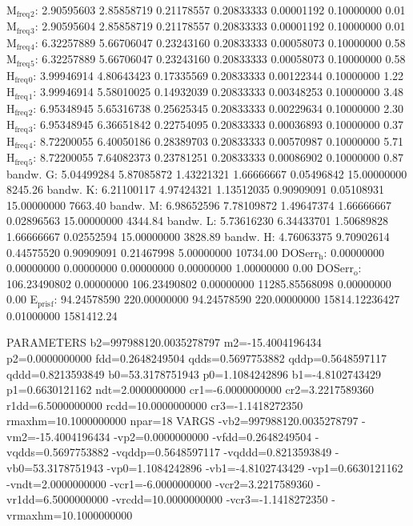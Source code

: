 \documentclass[11pt]{article}
\begin{document}
M\(_{\text{freq}}\)\(_{\text{2}}\):   2.90595603   2.85858719   0.21178557   0.20833333   0.00001192   0.10000000         0.01
M\(_{\text{freq}}\)\(_{\text{3}}\):   2.90595604   2.85858719   0.21178557   0.20833333   0.00001192   0.10000000         0.01
M\(_{\text{freq}}\)\(_{\text{4}}\):   6.32257889   5.66706047   0.23243160   0.20833333   0.00058073   0.10000000         0.58
M\(_{\text{freq}}\)\(_{\text{5}}\):   6.32257889   5.66706047   0.23243160   0.20833333   0.00058073   0.10000000         0.58
H\(_{\text{freq}}\)\(_{\text{0}}\):   3.99946914   4.80643423   0.17335569   0.20833333   0.00122344   0.10000000         1.22
H\(_{\text{freq}}\)\(_{\text{1}}\):   3.99946914   5.58010025   0.14932039   0.20833333   0.00348253   0.10000000         3.48
H\(_{\text{freq}}\)\(_{\text{2}}\):   6.95348945   5.65316738   0.25625345   0.20833333   0.00229634   0.10000000         2.30
H\(_{\text{freq}}\)\(_{\text{3}}\):   6.95348945   6.36651842   0.22754095   0.20833333   0.00036893   0.10000000         0.37
H\(_{\text{freq}}\)\(_{\text{4}}\):   8.72200055   6.40050186   0.28389703   0.20833333   0.00570987   0.10000000         5.71
H\(_{\text{freq}}\)\(_{\text{5}}\):   8.72200055   7.64082373   0.23781251   0.20833333   0.00086902   0.10000000         0.87
bandw. G:   5.04499284   5.87085872   1.43221321   1.66666667   0.05496842  15.00000000      8245.26
bandw. K:   6.21100117   4.97424321   1.13512035   0.90909091   0.05108931  15.00000000      7663.40
bandw. M:   6.98652596   7.78109872   1.49647374   1.66666667   0.02896563  15.00000000      4344.84
bandw. L:   5.73616230   6.34433701   1.50689828   1.66666667   0.02552594  15.00000000      3828.89
bandw. H:   4.76063375   9.70902614   0.44575520   0.90909091   0.21467998   5.00000000     10734.00
DOSerr\(_{\text{h}}\):   0.00000000   0.00000000   0.00000000   0.00000000   0.00000000   1.00000000         0.00
DOSerr\(_{\text{o}}\): 106.23490802   0.00000000 106.23490802   0.00000000 11285.85568098   0.00000000         0.00
E\(_{\text{pris}}\)\(_{\text{f}}\):  94.24578590 220.00000000  94.24578590 220.00000000 15814.12236427   0.01000000   1581412.24


PARAMETERS
  b2=997988120.0035278797 m2=-15.4004196434 p2=0.0000000000 fdd=0.2648249504 qdds=0.5697753882 qddp=0.5648597117 qddd=0.8213593849 b0=53.3178751943 p0=1.1084242896 b1=-4.8102743429 p1=0.6630121162 ndt=2.0000000000 cr1=-6.0000000000 cr2=3.2217589360 r1dd=6.5000000000 rcdd=10.0000000000 cr3=-1.1418272350 rmaxhm=10.1000000000 npar=18 
VARGS
    -vb2=997988120.0035278797 -vm2=-15.4004196434 -vp2=0.0000000000 -vfdd=0.2648249504 -vqdds=0.5697753882 -vqddp=0.5648597117 -vqddd=0.8213593849 -vb0=53.3178751943 -vp0=1.1084242896 -vb1=-4.8102743429 -vp1=0.6630121162 -vndt=2.0000000000 -vcr1=-6.0000000000 -vcr2=3.2217589360 -vr1dd=6.5000000000 -vrcdd=10.0000000000 -vcr3=-1.1418272350 -vrmaxhm=10.1000000000 
\end{document}
